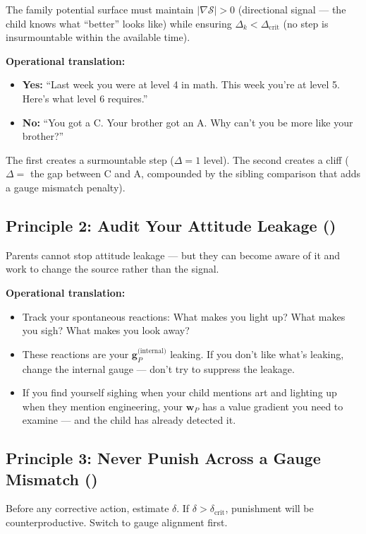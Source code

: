 \documentclass[11pt,a4paper]{article}
\newcommand{\gradS}{\nabla\mathcal{S}}
\begin{document}
The family potential surface must maintain $|\gradS| > 0$ (directional signal — the child knows what ``better'' looks like) while ensuring $\Delta_k < \Delta_{\text{crit}}$ (no step is insurmountable within the available time).

\textbf{Operational translation:}
\begin{itemize}
    \item \textbf{Yes:} ``Last week you were at level 4 in math. This week you're at level 5. Here's what level 6 requires.''
    \item \textbf{No:} ``You got a C. Your brother got an A. Why can't you be more like your brother?''
\end{itemize}

The first creates a surmountable step ($\Delta = 1$ level). The second creates a cliff ($\Delta = $ the gap between C and A, compounded by the sibling comparison that adds a gauge mismatch penalty).

\subsection{Principle 2: Audit Your Attitude Leakage ()}

Parents cannot stop attitude leakage — but they can become aware of it and work to change the source rather than the signal.

\textbf{Operational translation:}
\begin{itemize}
    \item Track your spontaneous reactions: What makes you light up? What makes you sigh? What makes you look away?
    \item These reactions are your $\mathbf{g}_P^{\text{(internal)}}$ leaking. If you don't like what's leaking, change the internal gauge — don't try to suppress the leakage.
    \item If you find yourself sighing when your child mentions art and lighting up when they mention engineering, your $\mathbf{w}_P$ has a value gradient you need to examine — and the child has already detected it.
\end{itemize}

\subsection{Principle 3: Never Punish Across a Gauge Mismatch ()}

Before any corrective action, estimate $\delta$. If $\delta > \delta_{\text{crit}}$, punishment will be counterproductive. Switch to gauge alignment first.
\end{document}
